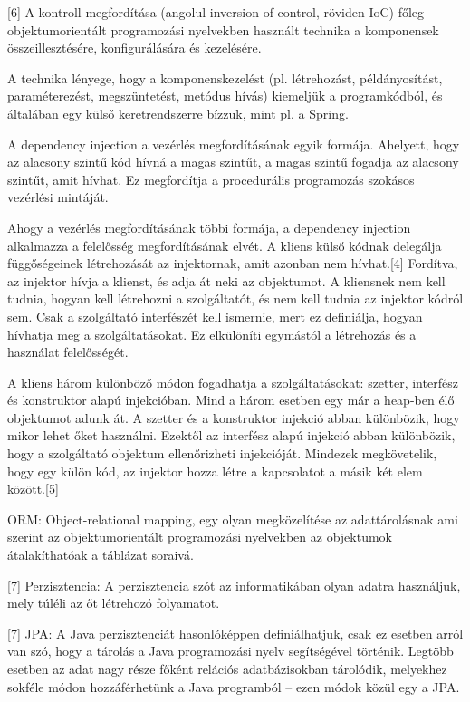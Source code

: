 \documentclass[11pt]{article}
\begin{document}
[6] A kontroll megfordítása (angolul inversion of control, röviden IoC) főleg objektumorientált programozási nyelvekben használt technika a komponensek összeillesztésére, konfigurálására és kezelésére.

A technika lényege, hogy a komponenskezelést (pl. létrehozást, példányosítást, paraméterezést, megszüntetést, metódus hívás) kiemeljük a programkódból, és általában egy külső keretrendszerre bízzuk, mint pl. a Spring.

A dependency injection a vezérlés megfordításának egyik formája. Ahelyett, hogy az alacsony szintű kód hívná a magas szintűt, a magas szintű fogadja az alacsony szintűt, amit hívhat. Ez megfordítja a procedurális programozás szokásos vezérlési mintáját.

Ahogy a vezérlés megfordításának többi formája, a dependency injection alkalmazza a felelősség megfordításának elvét. A kliens külső kódnak delegálja függőségeinek létrehozását az injektornak, amit azonban nem hívhat.[4] Fordítva, az injektor hívja a klienst, és adja át neki az objektumot. A kliensnek nem kell tudnia, hogyan kell létrehozni a szolgáltatót, és nem kell tudnia az injektor kódról sem. Csak a szolgáltató interfészét kell ismernie, mert ez definiálja, hogyan hívhatja meg a szolgáltatásokat. Ez elkülöníti egymástól a létrehozás és a használat felelősségét.

A kliens három különböző módon fogadhatja a szolgáltatásokat: szetter, interfész és konstruktor alapú injekcióban. Mind a három esetben egy már a heap-ben élő objektumot adunk át. A szetter és a konstruktor injekció abban különbözik, hogy mikor lehet őket használni. Ezektől az interfész alapú injekció abban különbözik, hogy a szolgáltató objektum ellenőrizheti injekcióját. Mindezek megkövetelik, hogy egy külön kód, az injektor hozza létre a kapcsolatot a másik két elem között.[5]

ORM: Object-relational mapping, egy olyan megközelítése az adattárolásnak ami szerint az objektumorientált programozási nyelvekben az objektumok átalakíthatóak a táblázat soraivá.

[7] Perzisztencia: A perzisztencia szót az informatikában olyan adatra használjuk, mely túléli az őt létrehozó folyamatot. 

[7] JPA: A Java perzisztenciát hasonlóképpen definiálhatjuk, csak ez esetben arról van szó, hogy a tárolás a Java programozási nyelv segítségével történik. Legtöbb esetben az adat nagy része főként relációs adatbázisokban tárolódik, melyekhez sokféle módon hozzáférhetünk a Java programból – ezen módok közül egy a JPA.
\end{document}
